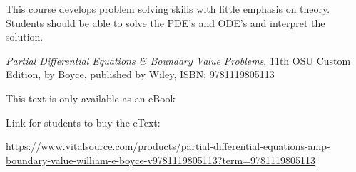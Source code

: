 \documentclass{osucourse}
\begin{document}
\CatalogDescription
\PrerequisitesAndExclusions

\begin{Purpose}
This course develops problem solving skills with little emphasis on
theory. Students should be able to solve the PDE's and ODE's and
interpret the solution.
\end{Purpose}

\begin{Text}
\emph{Partial Differential Equations \& Boundary Value Problems}, 11th
OSU Custom Edition, by Boyce, published by Wiley, ISBN: 9781119805113

This text is only available as an eBook

Link for students to buy the eText:

\url{https://www.vitalsource.com/products/partial-differential-equations-amp-boundary-value-william-e-boyce-v9781119805113?term=9781119805113}
\end{Text}
\end{document}
